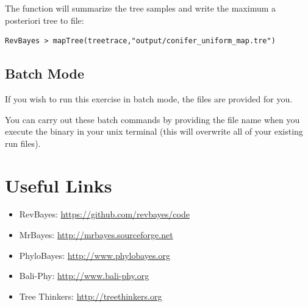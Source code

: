 The  function will summarize the tree samples and write the maximum a posteriori tree to file:
{\tt \begin{snugshade*}
\begin{lstlisting}
RevBayes > mapTree(treetrace,"output/conifer_uniform_map.tre")
\end{lstlisting}
\end{snugshade*}}





\bigskip
\subsection*{Batch Mode}

If you wish to run this exercise in batch mode, the files are provided for you. 

You can carry out these batch commands by providing the file name when you execute the  binary in your unix terminal (this will overwrite all of your existing run files).

\bigskip
\section*{Useful Links}

\begin{itemize}
\item RevBayes: \href{https://github.com/revbayes/code}{https://github.com/revbayes/code} \\ \vspace{-7mm}
\item MrBayes: \href{http://mrbayes.sourceforge.net/}{http://mrbayes.sourceforge.net} \\ \vspace{-7mm}
\item PhyloBayes: \href{http://megasun.bch.umontreal.ca/People/lartillot/www/index.htm}{http://www.phylobayes.org} \\ \vspace{-7mm}
\item Bali-Phy: \href{http://www.bali-phy.org/}{http://www.bali-phy.org} \\ \vspace{-7mm}
\item Tree Thinkers: \href{http://treethinkers.org/}{http://treethinkers.org} \\ \vspace{-7mm}
\end{itemize}

